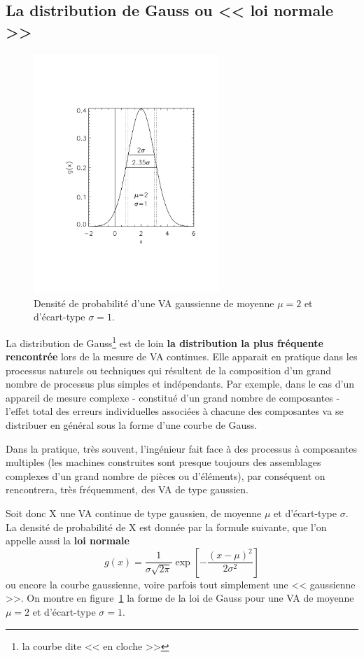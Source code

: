 \documentclass[main.tex]{subfiles}
\begin{document}
\subsection{La distribution de Gauss ou << loi normale >>}

\begin{figure}[h!]
    \centering
    \includegraphics[width=7cm]{assets/figures/loiGaussienne.pdf}
    \caption{Densité de probabilité d'une VA gaussienne de moyenne $\mu=2$ et d'écart-type $\sigma=1$.}
    \label{fig:ddpdlldg}
\end{figure}
La distribution de Gauss\footnote{la courbe dite << en cloche >>} est de loin \textbf{la distribution la plus fréquente rencontrée} lors de la mesure de VA continues. Elle apparait en pratique dans les processus naturels ou techniques qui résultent de la composition d'un grand nombre de processus plus simples et indépendants. Par exemple, dans le cas d'un appareil de mesure complexe - constitué d'un grand nombre de composantes - l'effet total des erreurs individuelles associées à chacune des composantes va se distribuer en général sous la forme d'une courbe de Gauss.

Dans la pratique, très souvent, l'ingénieur fait face à des processus à composantes multiples (les machines construites sont presque toujours des assemblages complexes d'un grand nombre de pièces ou d'éléments), par conséquent on rencontrera, très fréquemment, des VA de type gaussien.

Soit donc X une VA continue de type gaussien, de moyenne $\mu$ et d'écart-type $\sigma$. La densité de probabilité de X est donnée par la formule suivante, que l'on appelle aussi la \textbf{loi normale}
\begin{equation}
    g(x)=\frac{1}{\sigma\sqrt{2\pi}}\exp{\left[-\frac{(x-\mu)^2}{2\sigma^2}\right]}
\end{equation}
ou encore la courbe gaussienne, voire parfois tout simplement une << gaussienne >>. On montre en figure~\ref{fig:ddpdlldg} la forme de la loi de Gauss pour une VA de moyenne $\mu=2$ et d'écart-type $\sigma=1$.
\end{document}
